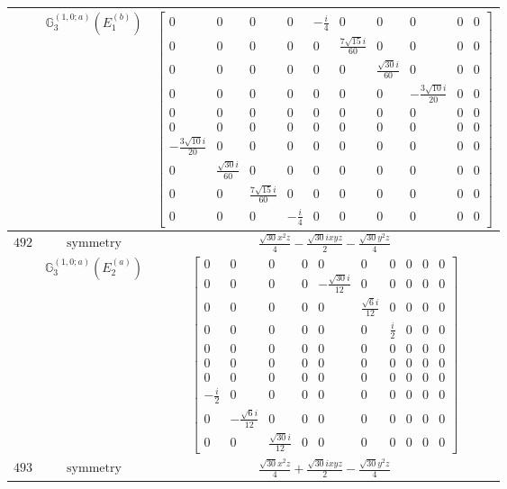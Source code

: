 \documentclass[fleqn,8pt,landscape]{jsarticle}
\begin{document}
\begin{longtable}{ccc}
$  $ & $ \mathbb{G}_{3}^{(1,0;a)}(E_{1}^{(b)}) $ & $ \begin{bmatrix} 0 & 0 & 0 & 0 & - \frac{i}{4} & 0 & 0 & 0 & 0 & 0 \\ 0 & 0 & 0 & 0 & 0 & \frac{7 \sqrt{15} i}{60} & 0 & 0 & 0 & 0 \\ 0 & 0 & 0 & 0 & 0 & 0 & \frac{\sqrt{30} i}{60} & 0 & 0 & 0 \\ 0 & 0 & 0 & 0 & 0 & 0 & 0 & - \frac{3 \sqrt{10} i}{20} & 0 & 0 \\ 0 & 0 & 0 & 0 & 0 & 0 & 0 & 0 & 0 & 0 \\ 0 & 0 & 0 & 0 & 0 & 0 & 0 & 0 & 0 & 0 \\ - \frac{3 \sqrt{10} i}{20} & 0 & 0 & 0 & 0 & 0 & 0 & 0 & 0 & 0 \\ 0 & \frac{\sqrt{30} i}{60} & 0 & 0 & 0 & 0 & 0 & 0 & 0 & 0 \\ 0 & 0 & \frac{7 \sqrt{15} i}{60} & 0 & 0 & 0 & 0 & 0 & 0 & 0 \\ 0 & 0 & 0 & - \frac{i}{4} & 0 & 0 & 0 & 0 & 0 & 0 \end{bmatrix} $ \\ \hline
$ 492 $ & $ \text{symmetry} $ & $ \frac{\sqrt{30} x^{2} z}{4} - \frac{\sqrt{30} i x y z}{2} - \frac{\sqrt{30} y^{2} z}{4} $ \\
$  $ & $ \mathbb{G}_{3}^{(1,0;a)}(E_{2}^{(a)}) $ & $ \begin{bmatrix} 0 & 0 & 0 & 0 & 0 & 0 & 0 & 0 & 0 & 0 \\ 0 & 0 & 0 & 0 & - \frac{\sqrt{30} i}{12} & 0 & 0 & 0 & 0 & 0 \\ 0 & 0 & 0 & 0 & 0 & \frac{\sqrt{6} i}{12} & 0 & 0 & 0 & 0 \\ 0 & 0 & 0 & 0 & 0 & 0 & \frac{i}{2} & 0 & 0 & 0 \\ 0 & 0 & 0 & 0 & 0 & 0 & 0 & 0 & 0 & 0 \\ 0 & 0 & 0 & 0 & 0 & 0 & 0 & 0 & 0 & 0 \\ 0 & 0 & 0 & 0 & 0 & 0 & 0 & 0 & 0 & 0 \\ - \frac{i}{2} & 0 & 0 & 0 & 0 & 0 & 0 & 0 & 0 & 0 \\ 0 & - \frac{\sqrt{6} i}{12} & 0 & 0 & 0 & 0 & 0 & 0 & 0 & 0 \\ 0 & 0 & \frac{\sqrt{30} i}{12} & 0 & 0 & 0 & 0 & 0 & 0 & 0 \end{bmatrix} $ \\ \hline
$ 493 $ & $ \text{symmetry} $ & $ \frac{\sqrt{30} x^{2} z}{4} + \frac{\sqrt{30} i x y z}{2} - \frac{\sqrt{30} y^{2} z}{4} $ \\

\end{longtable}
\end{document}
